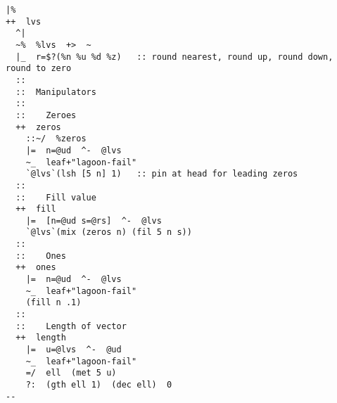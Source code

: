 \documentclass{article}
\begin{document}
\begin{lstlisting}
|%
++  lvs
  ^|
  ~%  %lvs  +>  ~
  |_  r=$?(%n %u %d %z)   :: round nearest, round up, round down, round to zero
  ::
  ::  Manipulators
  ::
  ::    Zeroes
  ++  zeros
    ::~/  %zeros
    |=  n=@ud  ^-  @lvs
    ~_  leaf+"lagoon-fail"
    `@lvs`(lsh [5 n] 1)   :: pin at head for leading zeros
  ::
  ::    Fill value
  ++  fill
    |=  [n=@ud s=@rs]  ^-  @lvs
    `@lvs`(mix (zeros n) (fil 5 n s))
  ::
  ::    Ones
  ++  ones
    |=  n=@ud  ^-  @lvs
    ~_  leaf+"lagoon-fail"
    (fill n .1)
  ::
  ::    Length of vector
  ++  length
    |=  u=@lvs  ^-  @ud
    ~_  leaf+"lagoon-fail"
    =/  ell  (met 5 u)
    ?:  (gth ell 1)  (dec ell)  0
--
\end{lstlisting}
\end{document}
